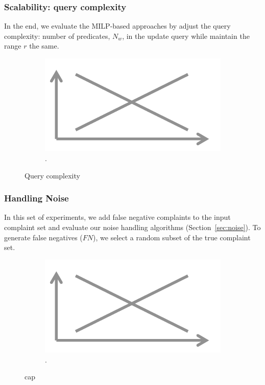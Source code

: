 {\subsubsection{Scalability: query complexity}
In the end, we evaluate the MILP-based approaches by adjust 
the query complexity: number of predicates, $N_w$, in the 
update query while maintain the range $r$ the same. 

 \begin{figure}[h]
\centering
  \begin{subfigure}[t]{.48\columnwidth}
  \includegraphics[width = .95\columnwidth]{figures/placeholder}
  \caption{.}
  \label{f:multiquery} 
  \end{subfigure}
  \caption{Query complexity }
\end{figure}

}
\subsubsection{Handling Noise}

In this set of experiments, we add false negative complaints to the input
complaint set and evaluate our noise handling algorithms (Section~\ref{sec:noise}).
To generate false negatives ($FN$), we select a random subset of the true complaint set.


\begin{figure}[h]
\centering
  \begin{subfigure}[t]{.48\columnwidth}
  \includegraphics[width = .95\columnwidth]{figures/placeholder}
  \caption{.}
  \label{f:falsenegative} 
  \end{subfigure}
  \caption{cap}

\end{figure}


